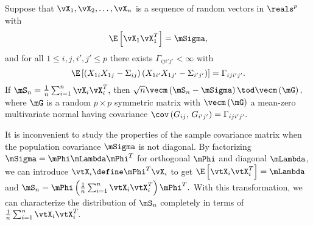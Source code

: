 \begin{lemma}\label{L:sample-cov-limit}
Suppose that 
\(
    \vX_1, \vX_2, \ldots, \vX_n
\)
is a sequence of \iid random vectors in $\reals^p$ with 
\[
    \E \left[
        \vX_1 \vX_1^T
    \right]
    =
    \mSigma,
\]
and for all $1 \leq i,j,i',j' \leq p$ there exists 
\(
    \Gamma_{iji'j'} < \infty
\)
with
\[
    \E \left[
        \left(
            X_{1i} X_{1j}
            -
            \Sigma_{ij}
        \right)
        \left(
            X_{1i'} X_{1j'}
            -
            \Sigma_{i'j'}
        \right)
    \right]
    =
    \Gamma_{iji'j'}.
\]
If
\(
    \mS_n
    =
    \frac{1}{n}
    \sum_{i=1}^n
        \vX_i \vX_i^T,
\)
then
\(
    \sqrt{n}
    \vecm \left( 
        \mS_n - \mSigma 
    \right)
    \tod
    \vecm \left( 
        \mG
    \right),
\)
where $\mG$ is a random $p \times p$ symmetric matrix with 
\(
    \vecm \left( \mG \right)
\)
a mean-zero multivariate normal having covariance
\(
    \cov \left(
        G_{ij}, \,
        G_{i'j'}
    \right)
    =
    \Gamma_{iji'j'}.
\)
\end{lemma}

\noindent
It is inconvenient to study the properties of the sample covariance matrix when the population covariance
\(
    \mSigma
\)
is not diagonal.  By factorizing
\(
    \mSigma
    =
    \mPhi
    \mLambda
    \mPhi^T
\)
for orthogonal $\mPhi$ and diagonal $\mLambda$, we can introduce
\(
    \vtX_i
    \define
    \mPhi^T \vX_i
\)
to get
\(
    \E \left[
        \vtX_i
        \vtX_i^T
    \right]
    =
    \mLambda
\)
and
\(
    \mS_n
    =
    \mPhi
    \left(
        \frac{1}{n}
        \sum_{i=1}^n
            \vtX_i \vtX_i^T
    \right)
    \mPhi^T.
\)
With this transformation, we can characterize the distribution of $\mS_n$ completely in terms of
\(
    \frac{1}{n}
    \sum_{i=1}^n
        \vtX_i \vtX_i^T.
\)

